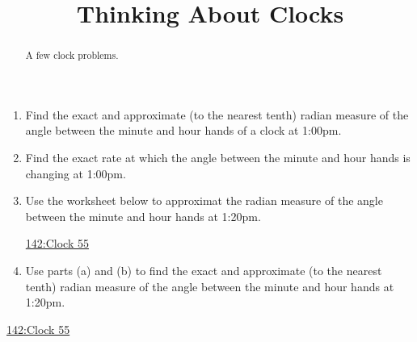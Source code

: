 \documentclass{ximera}
\title{Thinking About Clocks}
\begin{document}
\begin{abstract}
A few clock problems.
\end{abstract}
\maketitle

\begin{question} \label{Qdfr4tfds3}

\begin{enumerate}
\item Find the exact and approximate (to the nearest tenth) radian measure of the angle between the minute and hour hands of a clock at 1:00pm.

\item Find the exact rate at which the angle between the minute and hour hands is changing at 1:00pm.

\item Use the worksheet below to approximat the radian measure of the angle between the minute and hour hands at 1:20pm.

 
\begin{onlineOnly}
    \begin{center}
\end{center}
\end{onlineOnly}

\href{https://www.desmos.com/calculator/tkoaenjw2z}{142:Clock 55}

\item Use parts (a) and (b) to find the exact and approximate (to the nearest tenth) radian measure of the angle between the minute and hour hands at 1:20pm.
\end{enumerate}

 
\begin{onlineOnly}
    \begin{center}
\end{center}
\end{onlineOnly}

\href{https://www.desmos.com/calculator/tkoaenjw2z}{142:Clock 55}

\end{question}
\end{document}
